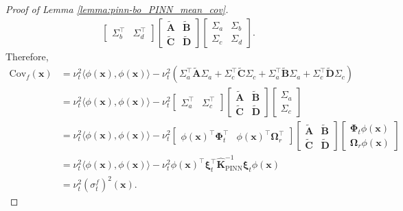 \begin{proof} [Proof of Lemma \ref{lemma:pinn-bo_PINN_mean_cov}]
\begin{align*}
\begin{bmatrix}
        \Sigma_b^\top & \Sigma_d^\top
\end{bmatrix} \begin{bmatrix}
    \widetilde{\mathbf{A}} & \widetilde{\mathbf{B}} \\
    \widetilde{\mathbf{C}} & \widetilde{\mathbf{D}}
        \end{bmatrix}  \begin{bmatrix}
                            \Sigma_a & \Sigma_b \\
                            \Sigma_c & \Sigma_d
                        \end{bmatrix}.
\end{align*}
Therefore, 
\begin{align*}
\mathrm{Cov}_f(\mathbf{x}) & = \nu_t^2 \langle \phi(\mathbf{x}),  \phi(\mathbf{x}) \rangle - \nu_t^2(\Sigma_a^\top \widetilde{\mathbf{A}}\Sigma_a + \Sigma_c^\top \widetilde{\mathbf{C}}\Sigma_c + \Sigma_a^\top \widetilde{\mathbf{B}}\Sigma_a + \Sigma_c^\top \widetilde{\mathbf{D}}\Sigma_c) \\
        & = \nu_t^2 \langle \phi(\mathbf{x}),  \phi(\mathbf{x}) \rangle - \nu_t^2 \begin{bmatrix}
            \Sigma_a^\top  & \Sigma_c^\top
        \end{bmatrix}
        \begin{bmatrix}
    \widetilde{\mathbf{A}} & \widetilde{\mathbf{B}} \\
    \widetilde{\mathbf{C}} & \widetilde{\mathbf{D}}
        \end{bmatrix} \begin{bmatrix}
            \Sigma_a \\ \Sigma_c
        \end{bmatrix}  \\
        &= \nu_t^2 \langle \phi(\mathbf{x}),  \phi(\mathbf{x}) \rangle - \nu_t^2\begin{bmatrix}
            \phi(\mathbf{x})^\top \boldsymbol{\Phi}_t^\top & \phi(\mathbf{x})^\top \boldsymbol{\Omega}_r^\top
        \end{bmatrix}  \begin{bmatrix}
    \widetilde{\mathbf{A}} & \widetilde{\mathbf{B}} \\
    \widetilde{\mathbf{C}} & \widetilde{\mathbf{D}}
        \end{bmatrix} \begin{bmatrix} \boldsymbol{\Phi}_t \phi(\mathbf{x}) \\ \boldsymbol{\Omega}_r \phi(\mathbf{x})  \end{bmatrix}  \\
        &= \nu_t^2 \langle \phi(\mathbf{x}),  \phi(\mathbf{x}) \rangle - \nu_t^2\phi(\mathbf{x})^\top \boldsymbol{\xi}_t^\top \mathbf{\widehat{K}}_\mathrm{PINN}^{-1} \boldsymbol{\xi}_t \phi(\mathbf{x})\\
        &= \nu_t^2 (\sigma_t^f)^2(\mathbf{x}).
\end{align*}
\end{proof}

